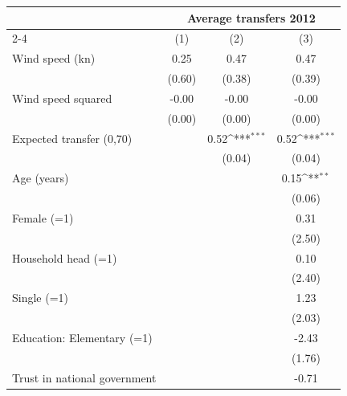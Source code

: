 {
\def\sym#1{\ifmmode^{#1}\else\(^{#1}\)\fi}
\begin{tabular}{l*{3}{c}}
\toprule
                    &\multicolumn{3}{c}{Average transfers 2012}                       \\\cmidrule(lr){2-4}
                    &\multicolumn{1}{c}{(1)}         &\multicolumn{1}{c}{(2)}         &\multicolumn{1}{c}{(3)}         \\
\midrule
Wind speed (kn)     &        0.25         &        0.47         &        0.47         \\
                    &      (0.60)         &      (0.38)         &      (0.39)         \\
Wind speed squared  &       -0.00         &       -0.00         &       -0.00         \\
                    &      (0.00)         &      (0.00)         &      (0.00)         \\
Expected transfer (0,70)&                     &        0.52\sym{***}&        0.52\sym{***}\\
                    &                     &      (0.04)         &      (0.04)         \\
Age (years)         &                     &                     &        0.15\sym{**} \\
                    &                     &                     &      (0.06)         \\
Female (=1)         &                     &                     &        0.31         \\
                    &                     &                     &      (2.50)         \\
Household head (=1) &                     &                     &        0.10         \\
                    &                     &                     &      (2.40)         \\
Single (=1)         &                     &                     &        1.23         \\
                    &                     &                     &      (2.03)         \\
Education: Elementary (=1)&                     &                     &       -2.43         \\
                    &                     &                     &      (1.76)         \\
Trust in national government&                     &                     &       -0.71         \\

\end{tabular}}
